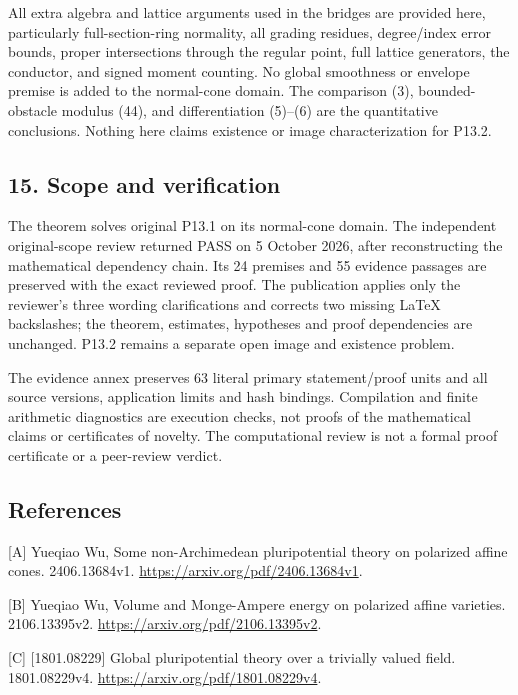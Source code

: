 \documentclass[
  10pt,
]{article}
\begin{document}
All extra algebra and lattice arguments used in the bridges are provided
here, particularly full-section-ring normality, all grading residues,
degree/index error bounds, proper intersections through the regular
point, full lattice generators, the conductor, and signed moment
counting. No global smoothness or envelope premise is added to the
normal-cone domain. The comparison (3), bounded-obstacle modulus (44),
and differentiation (5)--(6) are the quantitative conclusions. Nothing
here claims existence or image characterization for P13.2.

\subsection{15. Scope and verification}\label{scope-and-verification}

The theorem solves original P13.1 on its normal-cone domain. The
independent original-scope review returned PASS on 5 October 2026, after
reconstructing the mathematical dependency chain. Its 24 premises and 55
evidence passages are preserved with the exact reviewed proof. The
publication applies only the reviewer's three wording clarifications and
corrects two missing LaTeX backslashes; the theorem, estimates,
hypotheses and proof dependencies are unchanged. P13.2 remains a
separate open image and existence problem.

The evidence annex preserves 63 literal primary statement/proof units
and all source versions, application limits and hash bindings.
Compilation and finite arithmetic diagnostics are execution checks, not
proofs of the mathematical claims or certificates of novelty. The
computational review is not a formal proof certificate or a peer-review
verdict.

\subsection{References}\label{references}

{[}A{]} Yueqiao Wu, Some non-Archimedean pluripotential theory on
polarized affine cones. 2406.13684v1.
\url{https://arxiv.org/pdf/2406.13684v1}.

{[}B{]} Yueqiao Wu, Volume and Monge-Ampere energy on polarized affine
varieties. 2106.13395v2. \url{https://arxiv.org/pdf/2106.13395v2}.

{[}C{]} {[}1801.08229{]} Global pluripotential theory over a trivially
valued field. 1801.08229v4. \url{https://arxiv.org/pdf/1801.08229v4}.
\end{document}
